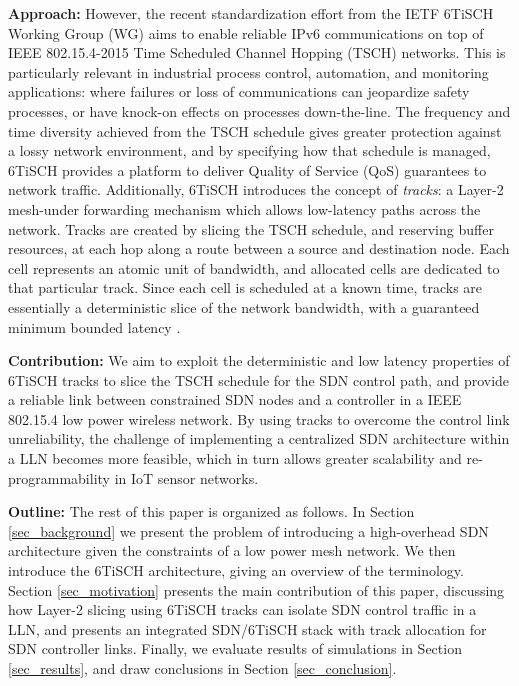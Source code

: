 \textbf{Approach:} However, the recent standardization effort from the IETF 6TiSCH Working Group (WG) \cite{6tisch_ietf_architecture} aims to enable reliable IPv6 communications on top of IEEE 802.15.4-2015 Time Scheduled Channel Hopping (TSCH) networks. This is particularly relevant in industrial process control, automation, and monitoring applications: where failures or loss of communications can jeopardize safety processes, or have knock-on effects on processes down-the-line. The frequency and time diversity achieved from the TSCH schedule gives greater protection against a lossy network environment, and by specifying how that schedule is managed, 6TiSCH provides a platform to deliver Quality of Service (QoS) guarantees to network traffic. Additionally, 6TiSCH introduces the concept of \textit{tracks}: a Layer-2 mesh-under forwarding mechanism \cite{6lowpan_routing_rfc} which allows low-latency paths across the network. Tracks are created by slicing the TSCH schedule, and reserving buffer resources, at each hop along a route between a source and destination node. Each cell represents an atomic unit of bandwidth, and allocated cells are dedicated to that particular track. Since each cell is scheduled at a known time, tracks are essentially a deterministic slice of the network bandwidth, with a guaranteed minimum bounded latency \cite{6tisch_ietf_architecture}. 

\textbf{Contribution:} We aim to exploit the deterministic and low latency properties of 6TiSCH tracks to slice the TSCH schedule for the SDN control path, and provide a reliable link between constrained SDN nodes and a controller in a IEEE 802.15.4 low power wireless network. By using tracks to overcome the control link unreliability, the challenge of implementing a centralized SDN architecture within a LLN becomes more feasible, which in turn allows greater scalability and re-programmability in IoT sensor networks.

\textbf{Outline:} The rest of this paper is organized as follows. In Section \ref{sec_background} we present the problem of introducing a high-overhead SDN architecture given the constraints of a low power mesh network. We then introduce the 6TiSCH architecture, giving an overview of the terminology. Section \ref{sec_motivation} presents the main contribution of this paper, discussing how Layer-2 slicing using 6TiSCH tracks can isolate SDN control traffic in a LLN, and presents an integrated SDN/6TiSCH stack with track allocation for SDN controller links. Finally, we evaluate results of simulations in Section \ref{sec_results}, and draw conclusions in Section \ref{sec_conclusion}.

